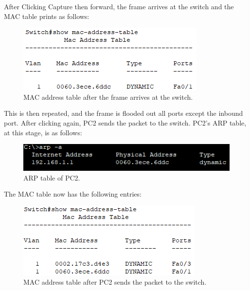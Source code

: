 \documentclass[a4paper,12pt]{article}
\begin{document}
After Clicking Capture then forward, the frame arrives at the switch and the MAC table prints as follows:
\begin{figure}[H]
\centering
\includegraphics[width=\linewidth, height=0.15\textheight,keepaspectratio]{Pictures_Lab1/mac address obj6.8.png}
\caption{MAC address table after the frame arrives at the switch.}
\end{figure}

This is then repeated, and the frame is flooded out all ports except the inbound port. After clicking again, PC2 sends the packet to the switch. PC2's ARP table, at this stage, is as follows:
\begin{figure}[H]
\centering
\includegraphics[width=\linewidth,keepaspectratio]{Pictures_Lab1/arp-a obj 6.10.png}
\caption{ARP table of PC2.}
\end{figure}
\pagebreak
The MAC table now has the following entries:
\begin{figure}[H]
\centering
\includegraphics[width=\linewidth, height=0.15\textheight,keepaspectratio]{Pictures_Lab1/mac address obj6.10.png}
\caption{MAC address table after PC2 sends the packet to the switch.}
\end{figure}
\end{document}
